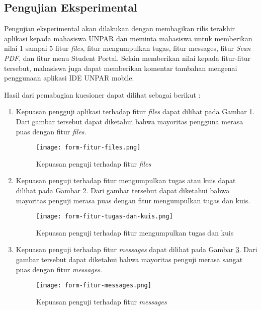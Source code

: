 \subsection{Pengujian Eksperimental}

Pengujian eksperimental akan dilakukan dengan membagikan rilis terakhir aplikasi kepada mahasiswa UNPAR dan meminta mahasiswa untuk memberikan nilai 1 sampai 5 fitur \textit{files}, fitur mengumpulkan tugas, fitur messages, fitur \textit{Scan PDF}, dan fitur menu Student Portal. Selain memberikan nilai kepada fitur-fitur tersebut, mahasiswa juga dapat memberikan komentar tambahan mengenai penggunaan aplikasi IDE UNPAR mobile.

Hasil dari pemabagian kuesioner dapat dilihat sebagai berikut :

\begin{enumerate}
\item Kepuasan pengguji aplikasi terhadap fitur \textit{files} dapat dilihat pada Gambar \ref{responses:feature:files}. Dari gambar tersebut dapat diketahui bahwa mayoritas pengguna merasa puas dengan fitur \textit{files}. 
\begin{figure}[H] 
	\centering  
	\texttt{[image: form-fitur-files.png]}  
	\caption[Kepuasan penguji terhadap fitur \textit{files}] {Kepuasan penguji terhadap fitur \textit{files}} 
	\label{responses:feature:files} 
\end{figure}

\item Kepuasan penguji terhadap fitur mengumpulkan tugas atau kuis dapat dilihat pada Gambar \ref{responses:feature:submission}. Dari gambar tersebut dapat diketahui bahwa mayoritas penguji merasa puas dengan fitur mengumpulkan tugas dan kuis.
\begin{figure}[H] 
	\centering  
	\texttt{[image: form-fitur-tugas-dan-kuis.png]}  
	\caption[Kepuasan penguji terhadap fitur mengumpulkan tugas dan kuis] {Kepuasan penguji terhadap fitur mengumpulkan tugas dan kuis} 
	\label{responses:feature:submission} 
\end{figure}

\item Kepuasan penguji terhadap fitur \textit{messages} dapat dilihat pada Gambar \ref{responses:feature:messages}. Dari gambar tersebut dapat diketahui bahwa mayoritas penguji merasa sangat puas dengan fitur \textit{messages}.
\begin{figure}[H] 
	\centering  
	\texttt{[image: form-fitur-messages.png]}  
	\caption[Kepuasan penguji terhadap fitur \textit{messages}] {Kepuasan penguji terhadap fitur \textit{messages}} 
	\label{responses:feature:messages} 
\end{figure}


\end{enumerate}
